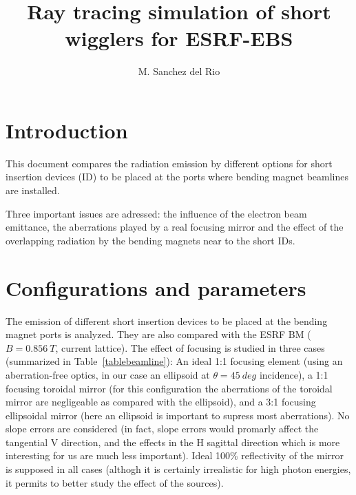 \documentclass[a4paper,10pt]{article}
\title{Ray tracing simulation of short wigglers for ESRF-EBS}
\author{M. Sanchez del Rio}
\begin{document}
\maketitle

% 

\section{Introduction}

This document compares the radiation emission by different options for short insertion devices (ID) to be placed at the ports where bending magnet 
beamlines are installed. 

Three important issues are adressed: the influence of the electron beam emittance, the aberrations played by a real focusing mirror and 
the effect of the overlapping radiation by the bending magnets near to the short IDs. 

\section{Configurations and parameters}

The emission of different short insertion devices to be placed at the bending magnet ports is analyzed. They are also compared with the 
ESRF BM ($B=0.856~T$, current lattice). The effect of focusing is studied in three cases (summarized in Table~\ref{tablebeamline}):
An ideal 1:1 focusing element (using an aberration-free optics, in our case an ellipsoid at $\theta=45~deg$ incidence), a 1:1 focusing 
toroidal mirror (for this configuration the aberrations of the toroidal mirror are negligeable as compared with the ellipsoid), and 
a 3:1 focusing ellipsoidal mirror (here an ellipsoid is important to supress most aberrations). No slope errors are considered (in fact,
slope errors would promarly affect the tangential V direction, and the effects in the H sagittal direction which is more interesting
for us are much less important). Ideal 100\% reflectivity of the mirror is supposed in all cases (althogh it is certainly irrealistic 
for high photon energies, it permits to better study the effect of the sources). 
\end{document}
